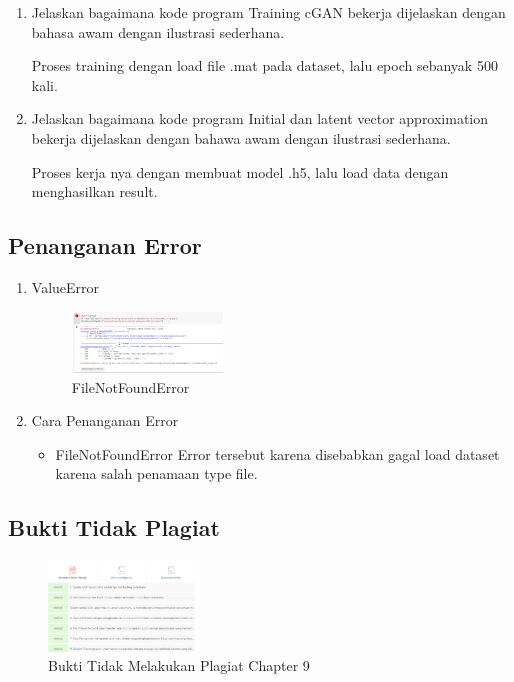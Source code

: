 \begin{enumerate}
	\item Jelaskan bagaimana kode program Training cGAN bekerja dijelaskan dengan bahasa awam dengan ilustrasi sederhana.
	\hfill\break
	
	Proses training dengan load file .mat pada dataset, lalu epoch sebanyak 500 kali.

	\item Jelaskan bagaimana kode program Initial dan latent vector approximation bekerja dijelaskan dengan bahawa awam dengan ilustrasi sederhana.
	\hfill\break
	
	Proses kerja nya dengan membuat model .h5, lalu load data dengan menghasilkan result.
\end{enumerate}
\subsection{Penanganan Error}
\begin{enumerate}
	\item ValueError
	\begin{figure}[H]
		\centering
		\includegraphics[width=4cm]{figures/1164013/err/9_file_not_found.png}
		\caption{FileNotFoundError}
	\end{figure}

	\item Cara Penanganan Error
	\begin{itemize}
		\item FileNotFoundError
		\hfill\break
		Error tersebut karena disebabkan gagal load dataset karena salah penamaan type file.
	\end{itemize}
\end{enumerate}
\subsection{Bukti Tidak Plagiat}
\begin{figure}[H]
	\includegraphics[width=4cm]{figures/1164013/ve/9.png}
	\centering
	\caption{Bukti Tidak Melakukan Plagiat Chapter 9}
\end{figure}